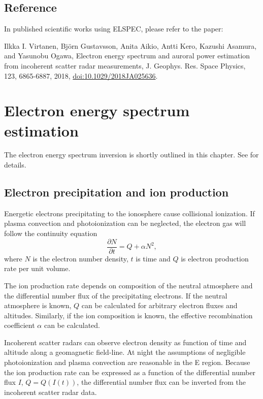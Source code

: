 \documentclass[12pt,a4paper]{report}
\begin{document}
\section{Reference}

In published scientific works using ELSPEC, please refer to the paper:

Ilkka I. Virtanen, Bj{\"o}rn Gustavsson, Anita Aikio, Antti Kero, Kazushi Asamura, and Yasunobu Ogawa, Electron energy spectrum and auroral power estimation from incoherent scatter radar measurements, J. Geophys. Res. Space Physics, 123, 6865-6887, 2018, \href{https://doi.org/doi:10.1029/2018JA025636}{doi:10.1029/2018JA025636}.


\chapter{Electron energy spectrum estimation}

The electron energy spectrum inversion is shortly outlined in this chapter. See \cite[][and references therein]{virtanen2018} for details. 

\section{Electron precipitation and ion production}

Energetic electrons precipitating to the ionosphere cause collisional ionization. If plasma convection and photoionization can be neglected, the electron gas will follow the continuity equation
\begin{equation}
\frac{\partial N}{\partial t} = Q + \alpha N^2,
\label{eqContinuity}
\end{equation}
where $N$ is the electron number density, $t$ is time  and $Q$ is electron production rate per unit volume.

The ion production rate depends on composition of the neutral atmosphere and the differential number flux of the precipitating electrons. If the neutral atmosphere is known, $Q$ can be calculated for arbitrary electron fluxes and altitudes. Similarly, if the ion composition is known, the effective recombination coefficient $\alpha$ can be calculated. 

Incoherent scatter radars can observe electron density as function of time and altitude along a geomagnetic field-line. At night the assumptions of negligible photoionization and plasma convection are reasonable in the E region. Because the ion production rate can be expressed as a function of the differential number flux $I$, $Q=Q(I(t))$, the differential number flux can be inverted from the incoherent scatter radar data.
\end{document}
